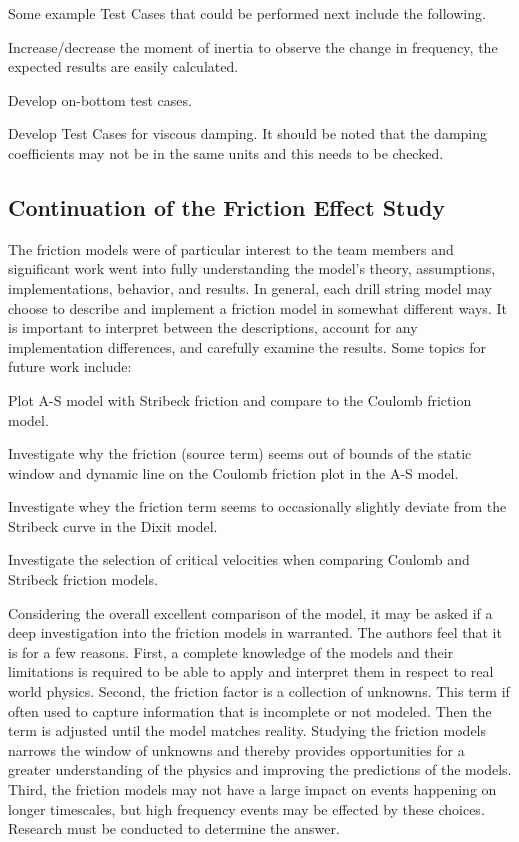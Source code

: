 Some example Test Cases that could be performed next include the following.
\begin{bulletedlist}
	\item Increase/decrease the moment of inertia to observe the change in frequency, the expected results are easily calculated.
	\item Develop on-bottom test cases.
    \item Develop Test Cases for viscous damping.  It should be noted that the damping coefficients may not be in the same units and this needs to be checked.
\end{bulletedlist}

\subsection{Continuation of the Friction Effect Study}
The friction models were of particular interest to the team members and significant work went into fully understanding the model's theory, assumptions, implementations, behavior, and results.  In general, each drill string model may choose to describe and implement a friction model in somewhat different ways.  It is important to interpret between the descriptions, account for any implementation differences, and carefully examine the results.  Some topics for future work include:
\begin{bulletedlist}
	\item Plot A-S model with Stribeck friction and compare to the Coulomb friction model.
	\item Investigate why the friction (source term) seems out of bounds of the static window and dynamic line on the Coulomb friction plot in the A-S model.
	\item Investigate whey the friction term seems to occasionally slightly deviate from the Stribeck curve in the Dixit model.
	\item Investigate the selection of critical velocities when comparing Coulomb and Stribeck friction models.
\end{bulletedlist}

Considering the overall excellent comparison of the model, it may be asked if a deep investigation into the friction models in warranted. The authors feel that it is for a few reasons.  First, a complete knowledge of the models and their limitations is required to be able to apply and interpret them in respect to real world physics.  Second, the friction factor is a collection of unknowns.  This term if often used to capture information that is incomplete or not modeled.  Then the term is adjusted until the model matches reality.  Studying the friction models narrows the window of unknowns and thereby provides opportunities for a greater understanding of the physics and improving the predictions of the models.  Third, the friction models may not have a large impact on events happening on longer timescales, but high frequency events may be effected by these choices.  Research must be conducted to determine the answer.


